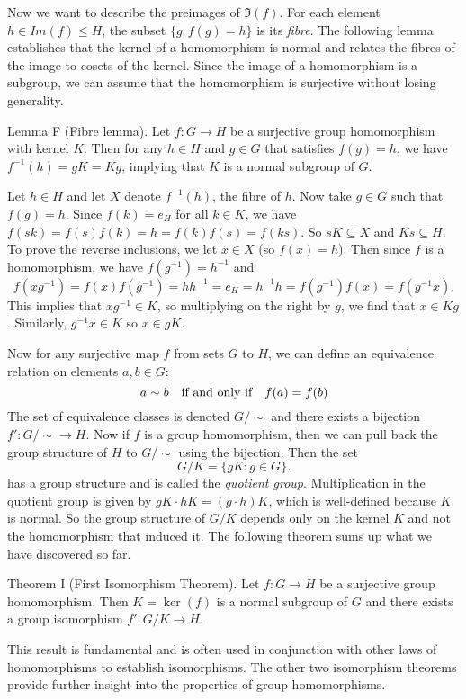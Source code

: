 Now we want to describe the preimages of $\Im(f)$. For each element $h\in Im(f)\leq H$, the subset $\{g : f(g) = h\}$ is its {\it fibre}. The following lemma establishes that the kernel of a homomorphism is normal and relates the fibres of the image to cosets of the kernel. Since the image of a homomorphism is a subgroup, we can assume that the homomorphism is surjective without losing generality.

\parenproclaim Lemma F (Fibre lemma). Let $f:G\rightarrow H$ be a surjective group homomorphism with kernel $K$. Then for any $h\in H$ and $g\in G$ that satisfies $f(g) = h$, we have $f^{-1}(h) = gK = Kg$, implying that $K$ is a normal subgroup of $G$.

\proof Let $h\in H$ and let $X$ denote $f^{-1}(h)$, the fibre of $h$. Now take $g\in G$ such that $f(g) = h$. Since $f(k) = e_H$ for all $k\in K$, we have $f(sk) = f(s)f(k) = h = f(k)f(s) = f(ks)$. So $sK\subseteq X$ and $Ks\subseteq H$. To prove the reverse inclusions, we let $x\in X$ (so $f(x) = h$). Then since $f$ is a homomorphism, we have $f(g^{-1}) = h^{-1}$ and
$$f(xg^{-1}) = f(x)f(g^{-1}) = hh^{-1} = e_H = h^{-1}h = f(g^{-1})f(x) = f(g^{-1}x).$$
This implies that $xg^{-1}\in K$, so multiplying on the right by $g$, we find that $x\in Kg$. Similarly, $g^{-1}x\in K$ so $x\in gK$.\slug

Now for any surjective map $f$ from sets $G$ to $H$, we can define an equivalence relation on elements $a,b\in G$:
$$a\sim b\quad \hbox{if and only if}\quad f(a) = f(b)$$
The set of equivalence classes is denoted $G/{\sim}$ and there exists a bijection $f':G/{\sim} \rightarrow H$. Now if $f$ is a group homomorphism, then we can pull back the group structure of $H$ to $G/{\sim}$ using the bijection. Then the set
$$G/K = \{gK : g\in G\}.$$
has a group structure and is called the {\it quotient group}. Multiplication in the quotient group is given by $gK\cdot hK = (g\cdot h) K$, which is well-defined because $K$ is normal. So the group structure of $G/K$ depends only on the kernel $K$ and not the homomorphism that induced it. The following theorem sums up what we have discovered so far.

\parenproclaim Theorem I (First Isomorphism Theorem). Let $f:G\rightarrow H$ be a surjective group homomorphism. Then $K = \ker(f)$ is a normal subgroup of $G$ and there exists a group isomorphism $f':G/K \rightarrow H$.\slug

This result is fundamental and is often used in conjunction with other laws of homomorphisms to establish isomorphisms. The other two isomorphism theorems provide further insight into the properties of group homomorphisms.

